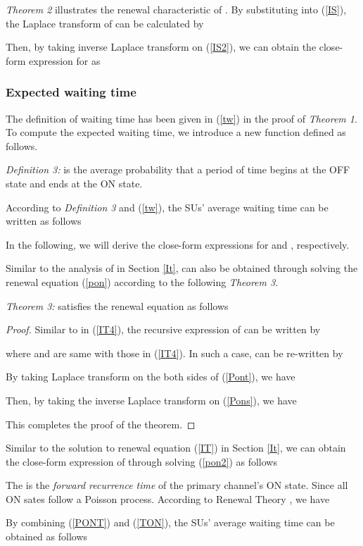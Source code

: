 \documentclass[11pt,draftcls]{IEEEtran}{\onecolumn}
\begin{document}
\emph{Theorem 2} illustrates the renewal characteristic of .
By substituting
 into
(\ref{IS}), the Laplace transform of  can be calculated by

Then, by taking inverse Laplace transform on (\ref{IS2}), we can
obtain the close-form expression for  as


\subsubsection{Expected waiting time }
The definition of waiting time  has been given in (\ref{tw}) in
the proof of \emph{Theorem 1}. To compute the expected waiting time,
we introduce a new function defined as follows.

\emph{Definition 3:}  is the average
probability that a period of time  begins at the OFF state and
ends at the ON state.

According to \emph{Definition 3} and (\ref{tw}), the SUs' average
waiting time  can be written as follows

In the following, we will derive the close-form expressions for
 and
, respectively.

Similar to the analysis of  in Section \ref{It},
 can also be obtained through solving the
renewal equation (\ref{pon}) according to the following
\emph{Theorem 3}.

\emph{Theorem 3:}  satisfies the renewal
equation as follows


\begin{proof}
Similar to  in (\ref{IT4}), the recursive expression of
 can be written by

where  and  are same with those in (\ref{IT4}). In such a
case,  can be re-written by

By taking Laplace transform on the both sides of (\ref{Pont}), we
have

Then, by taking the inverse Laplace transform on (\ref{Pons}), we
have

This completes the proof of the theorem.
\end{proof}

Similar to the solution to renewal equation (\ref{IT}) in Section
\ref{It}, we can obtain the close-form expression of
 through solving (\ref{pon2})  as follows


The  is the \emph{forward recurrence
time} of the primary channel's ON state. Since all ON sates follow a
Poisson process. According to Renewal Theory \cite{renew}, we have


By combining (\ref{PONT}) and (\ref{TON}), the SUs' average waiting
time  can be obtained as follows
\end{document}
